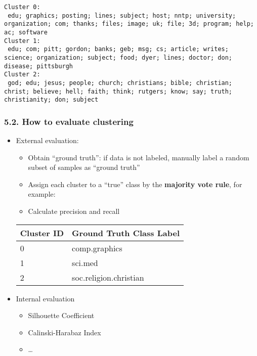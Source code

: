 \documentclass[11pt]{article}
\providecommand{\tightlist}{%
      \setlength{\itemsep}{0pt}\setlength{\parskip}{0pt}}
\begin{document}
    \begin{Verbatim}[commandchars=\\\{\}]
Cluster 0:
 edu; graphics; posting; lines; subject; host; nntp; university; organization; com; thanks; files; image; uk; file; 3d; program; help; ac; software 
Cluster 1:
 edu; com; pitt; gordon; banks; geb; msg; cs; article; writes; science; organization; subject; food; dyer; lines; doctor; don; disease; pittsburgh 
Cluster 2:
 god; edu; jesus; people; church; christians; bible; christian; christ; believe; hell; faith; think; rutgers; know; say; truth; christianity; don; subject 

    \end{Verbatim}

    \hypertarget{how-to-evaluate-clustering}{%
\subsubsection{5.2. How to evaluate
clustering}\label{how-to-evaluate-clustering}}

\begin{itemize}
\tightlist
\item
  External evaluation:

  \begin{itemize}
  \tightlist
  \item
    Obtain ``ground truth'': if data is not labeled, manually label a
    random subset of samples as ``ground truth''
  \item
    Assign each cluster to a ``true'' class by the \textbf{majority vote
    rule}, for example:
  \item
    Calculate precision and recall
  \end{itemize}

  \begin{longtable}[]{@{}ll@{}}
  \toprule
  Cluster ID & Ground Truth Class Label\tabularnewline
  \midrule
  \endhead
  0 & comp.graphics\tabularnewline
  1 & sci.med\tabularnewline
  2 & soc.religion.christian\tabularnewline
  \bottomrule
  \end{longtable}
\item
  Internal evaluation

  \begin{itemize}
  \tightlist
  \item
    Silhouette Coefficient
  \item
    Calinski-Harabaz Index
  \item
    \ldots{}
  \end{itemize}
\end{itemize}
\end{document}
